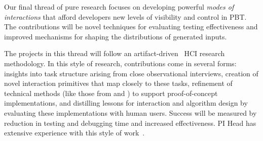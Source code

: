 


Our final thread of pure research focuses on developing powerful
\emph{modes of interactions} that afford developers new levels of visibility and control in PBT. The contributions will be novel techniques for evaluating testing effectiveness and improved mechanisms for shaping the distributions of generated inputs.

%
%

The projects in this thread
 will follow an
artifact-driven~\cite{ref:wobbrock2016research} HCI research methodology.
In this style of research, contributions come in several forms: insights into task
structure arising from close observational interviews, creation of novel
interaction primitives that map closely to these tasks, refinement of
technical methods (like those from  and
) to support proof-of-concept implementations,
and distilling
lessons for interaction and algorithm design by evaluating these
implementations
with human users. Success will be measured by
reduction in
testing and debugging time and increased effectiveness.
PI Head has extensive experience with this style of work~\cite{ref:head2015tutorons,ref:suzuki2017tracediff,ref:head2017writing,ref:head2018when,ref:head2018interactive,ref:head2019managing,ref:head2020composing}.

